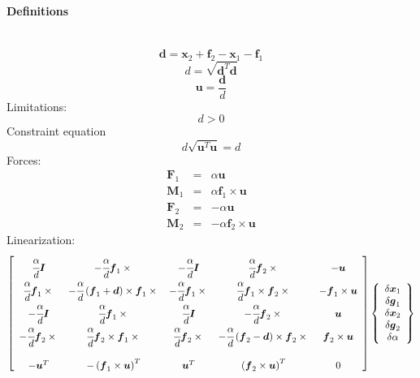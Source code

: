 \documentclass[10pt,dvips,fleqn]{report}
\newcommand{\T}[1]{\boldsymbol{#1}}
\begin{document}
\paragraph{Definitions} \
\begin{equation}
	\T{d} = \T{x}_2 + \T{f}_2 - \T{x}_1 - \T{f}_1
\end{equation}
\begin{equation}
	d = \sqrt{\T{d}^T \T{d}}
\end{equation}
\begin{equation}
	\T{u} = \frac{\T{d}}{d}
\end{equation}
Limitations:
\begin{equation}
	d > 0
\end{equation}
Constraint equation 
\begin{equation}
	d \sqrt{\T{u}^T \T{u}} = d
\end{equation}
Forces:
\begin{eqnarray}
	\T{F}_1 & = & \alpha \T{u} \\
	\T{M}_1 & = & \alpha \T{f}_1 \times \T{u} \\
	\T{F}_2 & = & -\alpha \T{u} \\
	\T{M}_2 & = & -\alpha \T{f}_2 \times \T{u}
\end{eqnarray}
Linearization:
\begin{equation}
	\sqbr{\matr{ccccc}{
		\cfrac{\alpha}{d}\T{I} & -\cfrac{\alpha}{d}\T{f}_1\times{} &
			-\cfrac{\alpha}{d}\T{I} & \cfrac{\alpha}{d}\T{f}_2\times{} & -\T{u} \\
		\cfrac{\alpha}{d}\T{f}_1\times{} & 
			-\cfrac{\alpha}{d}\plbr{\T{f}_1 + \T{d}}\times\T{f}_1\times{} &
			-\cfrac{\alpha}{d}\T{f}_1\times{} & 
			\cfrac{\alpha}{d}\T{f}_1\times\T{f}_2\times{} & 
			-\T{f}_1\times\T{u} \\
		-\cfrac{\alpha}{d}\T{I} & \cfrac{\alpha}{d}\T{f}_1\times{} &
			\cfrac{\alpha}{d}\T{I} & -\cfrac{\alpha}{d}\T{f}_2\times{} & \T{u} \\
		-\cfrac{\alpha}{d}\T{f}_2\times{} &
			\cfrac{\alpha}{d}\T{f}_2\times\T{f}_1\times{} &
			\cfrac{\alpha}{d}\T{f}_2\times{} &
			- \cfrac{\alpha}{d}\plbr{\T{f}_2 - \T{d}}\times{\T{f}_2\times{}} &
			\T{f}_2\times\T{u} \\
		\\
		-\T{u}^T & - \plbr{\T{f}_1\times\T{u}}^T & 
			\T{u}^T & \plbr{\T{f}_2\times\T{u}}^T & 0
	}}\cubr{\cvvect{
		\delta\T{x}_1 \\
		\delta\T{g}_1 \\
		\delta\T{x}_2 \\
		\delta\T{g}_2 \\
		\delta\alpha
	}}
\end{equation}
\end{document}
